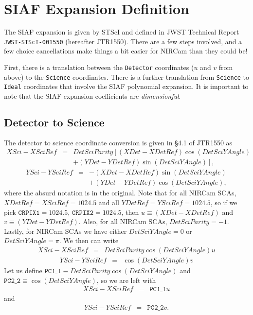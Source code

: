 \documentclass[10pt]{article}
\newcommand{\NCu}{\ensuremath{\mathtt{PC1\_1}}}
\newcommand{\NCv}{\ensuremath{\mathtt{PC2\_2}}}
\begin{document}
\section{SIAF Expansion Definition}

The SIAF expansion is given by STScI and defined in JWST Technical Report {\tt JWST-STScI-001550} (hereafter JTR1550). There
are a few steps involved, and a few choice cancellations make things a bit easier for NIRCam than they
could be!

First, there is a translation between the {\tt Detector} coordinates ($u$ and $v$ from above) to the
{\tt Science} coordinates. There is a further translation from {\tt Science} to {\tt Ideal} coordinates
that involve the SIAF polynomial expansion. It is important to note that the SIAF expansion coefficients
are \emph{dimensionful}.

\subsection{Detector to Science}

The detector to science coordinate conversion is given in \S 4.1 of JTR1550 as
\begin{eqnarray}
XSci - XSciRef &=& DetSciParity\left[\left(XDet - XDetRef\right)\cos\left(DetSciYAngle\right)\right.\\
               &&+ \left.\left(YDet - YDetRef\right)\sin\left(DetSciYAngle\right)\right],\nonumber
\end{eqnarray}
\begin{eqnarray}
YSci - YSciRef &=& -\left(XDet - XDetRef\right)\sin\left(DetSciYAngle\right)\\ 
               &&+ \left(YDet - YDetRef\right)\cos\left(DetSciYAngle\right),\nonumber
\end{eqnarray}
\noindent
where the absurd notation is in the original.  Note that for all NIRCam SCAs, $XDetRef=XSciRef=1024.5$
and all $YDetRef=YSciRef=1024.5$, so if we pick $\mathtt{CRPIX1}=1024.5$, $\mathtt{CRPIX2}=1024.5$,
then $u\equiv\left(XDet - XDetRef\right)$ and $v\equiv\left(YDet - YDetRef\right)$. Also, for
all NIRCam SCAs, $DetSciParity=-1$. Lastly, for NIRCam SCAs we have either $DetSciYAngle=0$ or
$DetSciYAngle=\pi$. We then can write
\begin{eqnarray}
XSci - XSciRef &=& DetSciParity\cos\left(DetSciYAngle\right) u
\end{eqnarray}
\begin{eqnarray}
YSci - YSciRef &=& \cos\left(DetSciYAngle\right) v
\end{eqnarray}
\noindent
Let us define $\NCu \equiv DetSciParity\cos\left(DetSciYAngle\right)$ and 
$\NCv \equiv \cos\left(DetSciYAngle\right)$, so we are left with
\begin{eqnarray}
XSci - XSciRef &=& \NCu u
\end{eqnarray}
\noindent
and
\begin{eqnarray}
YSci - YSciRef &=& \NCv v.
\end{eqnarray}
\end{document}
